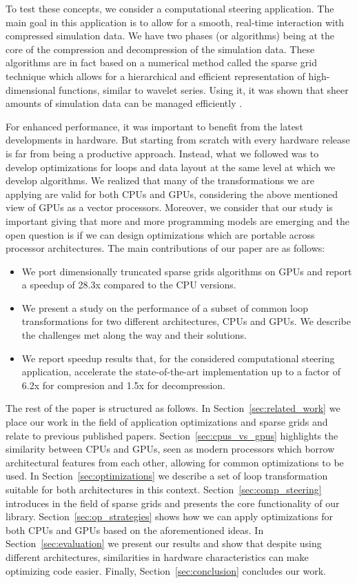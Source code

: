 To test these concepts, we consider a computational steering application. The
main goal in this application is to allow for a smooth, real-time interaction
with compressed simulation data. We have two phases (or algorithms) being at the
core of the compression and decompression of the simulation data. These
algorithms are in fact based on a numerical method called the sparse grid
technique which allows for a hierarchical and efficient representation of
high-dimensional functions, similar to wavelet series. Using it, it was shown
that sheer amounts of simulation data can be managed efficiently
\cite{Butnaru201156}.

For enhanced performance, it was important to benefit from the latest
developments in hardware. But starting from scratch with every hardware release
is far from being a productive approach. Instead, what we followed was to
develop optimizations for loops and data layout at the same level at which we
develop algorithms. We realized that many of the transformations we are applying
are valid for both CPUs and GPUs, considering the above mentioned view of GPUs
as a vector processors. Moreover, we consider that our study is important giving
that more and more programming models are emerging and the open question is if
we can design optimizations which are portable across processor architectures.
The main contributions of our paper are as follows:

\begin{itemize}
  \item We port dimensionally truncated sparse grids algorithms on GPUs and
  report a speedup of 28.3x compared to the CPU versions.
  \item We present a study on the performance of a subset of common loop
  transformations for two different architectures, CPUs and GPUs. We describe
  the challenges met along the way and their solutions.
  \item We report speedup results that, for the considered computational
  steering application, accelerate the state-of-the-art implementation up to a
  factor of 6.2x for compresion and 1.5x for decompression.
\end{itemize}

The rest of the paper is structured as follows. In
Section~\ref{sec:related_work} we place our work in the field of application
optimizations and sparse grids and relate to previous published papers.
Section~\ref{sec:cpus_vs_gpus} highlights the similarity between CPUs and GPUs,
seen as modern processors which borrow architectural features from each other,
allowing for common optimizations to be used.
In Section~\ref{sec:optimizations} we describe a set of loop transformation
suitable for both architectures in this context. Section~\ref{sec:comp_steering}
introduces in the field of sparse grids and presents the core functionality of
our library. Section~\ref{sec:op_strategies} shows how we can apply
optimizations for both CPUs and GPUs based on the aforementioned ideas. In
Section~\ref{sec:evaluation} we present our results and show that despite using
different architectures, similarities in hardware characteristics can make
optimizing code easier. Finally, Section~\ref{sec:conclusion} concludes our
work.

